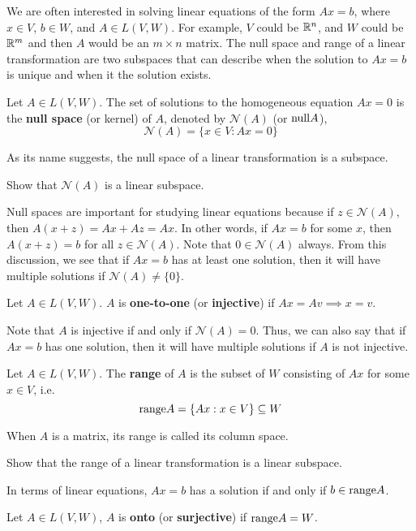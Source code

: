 We are often interested in solving linear equations of the form $A x =
b$, where $x \in V$, $b \in W$, and $A \in L(V,W)$. For example, $V$
could be $\mathbb{R}^n$, and $W$ could be $\mathbb{R}^m$ and then $A$ would be an $m
\times n$ matrix. The null space and range of a linear transformation
are two subspaces that can describe when the solution to $Ax=b$ is
unique and when it the solution exists.

\begin{definition}
  Let $A \in L(V,W)$. The set of solutions to the homogeneous
  equation $Ax = 0$ is the \textbf{null space} (or kernel) of
  $A$, denoted by $\mathcal{N}(A)$ (or $\mathrm{null} A$),
  \[ \mathcal{N}(A) = \{x \in V: Ax = 0 \} \]
\end{definition}
As its name suggests, the null space of a linear transformation is a
subspace.
\begin{exercise}
  Show that $\mathcal{N}(A)$ is a linear subspace.
\end{exercise}
Null spaces are important for studying linear equations because if
$z \in \mathcal{N}(A)$, then $A (x + z) = Ax + A z = Ax$. In other
words, if $Ax = b$ for some $x$, then $A(x+z) = b$ for all
$z \in \mathcal{N}(A)$. Note that $0 \in \mathcal{N}(A)$ always. From
this discussion, we see that if $A x = b$ has at least one solution,
then it will have multiple solutions if $\mathcal{N}(A) \neq \{0 \}$.
\begin{definition}
  Let $A \in L(V,W)$. $A$ is \textbf{one-to-one} (or
  \textbf{injective}) if $Ax = A v \implies x = v$.
\end{definition}
Note that $A$ is injective if and only if $\mathcal{N}(A) = 0$. Thus,
we can also say that if $A x = b$ has one solution, then it will have
multiple solutions if $A$ is not injective.

\begin{definition}
  Let $A \in L(V,W)$. The \textbf{range} of $A$ is the subset of $W$
  consisting of $A x$ for some $x \in V$, i.e.
  \[ \mathrm{range} A = \{ Ax: x \in V \} \subseteq W \]
\end{definition}
When $A$ is a matrix, its range is called its column space. 
\begin{exercise}
  Show that the range of a linear transformation is a linear subspace.
\end{exercise}
In terms of linear equations, $Ax = b$ has a solution if and only if
$b \in \mathrm{range} A$. 
\begin{definition}
  Let $A \in L(V,W)$, $A$ is \textbf{onto} (or \textbf{surjective}) if
  $\mathrm{range} A = W$.
\end{definition}

